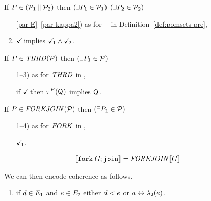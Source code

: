 
\begin{definition}$\phantom{\;}$\par

  \noindent
  If $P \in (\mathcal{P}_1\mathbin{\parallel}\mathcal{P}_2)$ then
  $(\exists P_1\in\mathcal{P}_1)$ $(\exists P_2\in\mathcal{P}_2)$
  \begin{enumerate}
    \setcounter{enumi}{\value{pomsetPreParCount}}
  \item[\ref{par-E}--\ref{par-kappa2})]
    as for $\mathbin{\parallel}$ in Definition~\ref{def:pomsets-pre},
  \item \label{par-tick}
    $\checkmark\!$ implies $\checkmark\!_1\land\checkmark\!_2$.
  \end{enumerate}

  \noindent
  If $\aPS \in \sTHREAD{\aPSS}$ then
  $(\exists P_1\in\mathcal{P})$
  \begin{enumerate}
    \setcounter{enumi}{\value{pomsetXThreadCount}}
  \item[1--3)]
    as for $\sTHREAD{}$ in ,
  \item[{\labeltext[T4]{T4)}{T4}}] if $\checkmark\!$ then $\aTr{\aEvs}{\Q{}}$ implies $\mathsf{Q}_{}$.
  \end{enumerate}    

  \noindent
  If $\aPS \in \sFORKJOIN{\aPSS}$ then
  $(\exists P_1\in\mathcal{P})$
  \begin{enumerate}
    \setcounter{enumi}{\value{pomsetXForkCount}}
  \item[1--4)]
    as for $\sFORK{}$ in ,
  \item[{\labeltext[F5]{F5)}{F5}}]
    $\checkmark\!_1$.
  \end{enumerate}    
\end{definition}

\begin{align*}
  \sem{\FORKJOIN{\aGrp}} &= \sFORKJOIN{}\sem{\aGrp}  
\end{align*}

We can then encode coherence as follows.
\begin{enumerate}
  \setcounter{enumi}{\value{pomsetXSemiCount}}
\item if $d\in E_1$ and $e\in E_2$ either $d<e$ or $a\mathrel\leftrightarrow\lambda_2(e)$.
\end{enumerate}


